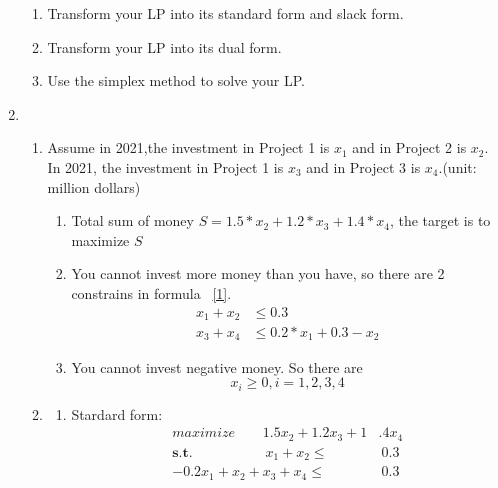 \documentclass[12pt,a4paper]{article}
\makeatletter
\newtheorem*{solution}{Solution}
\theoremstyle{definition}
\renewenvironment{solution}[1][Solution] {\par\pushQED{\qed}\normalfont\topsep6\p@\@plus6\p@\relax\trivlist\item[\hskip\labelsep\bfseries#1\@addpunct{.}]\ignorespaces}{\popQED\endtrivlist\@endpefalse} \makeatother
\makeatother
\begin{document}
\begin{enumerate}
\begin{enumerate}
    \item
    Transform your LP into its standard form and slack form.

    \item
    Transform your LP into its dual form.

    \item
    Use the simplex method to solve your LP.
    \end{enumerate}
    \begin{solution}
        ~\par
    \begin{enumerate}
        \item Assume in 2021,the investment in Project 1 is $x_1$ and in Project 2 is $x_2$. In 2021, the investment in Project 1 is $x_3$ and in Project 3 is $x_4$.(unit: million dollars)
        \begin{enumerate}
        \item 
        Total sum of money $S=1.5*x_2+1.2*x_3+1.4*x_4$, the target is to maximize $S$
        \item 
        You cannot invest more money than you have, so there are 2 constrains in formula ~\ref{1}.\\
        \begin{equation}
            \label{1}
            \begin{aligned}
            x_1+x_2&\le 0.3\\
            x_3+x_4&\le 0.2*x_1+0.3-x_2 
            \end{aligned}
        \end{equation}
        \item 
        You cannot invest negative money. So there are\\
        \begin{equation}
            x_i\ge 0, i=1,2,3,4
        \end{equation}
        \end{enumerate}
        \item        
        \begin{enumerate}
            \item Stardard form:
            \begin{equation}
                \begin{aligned}
                maximize ~~~~~~~~~1.5x_2+1.2x_3+1&.4x_4\\
                \textbf{s.t. }~~~~~~~~~~~~~~~~~~~~~~x_1+x_2\le&~0.3\\
               -0.2x_1+x_2+x_3+x_4\le&~0.3\\

\end{aligned}
\end{equation}
\end{enumerate}
\end{enumerate}
\end{solution}
\end{enumerate}
\end{document}
